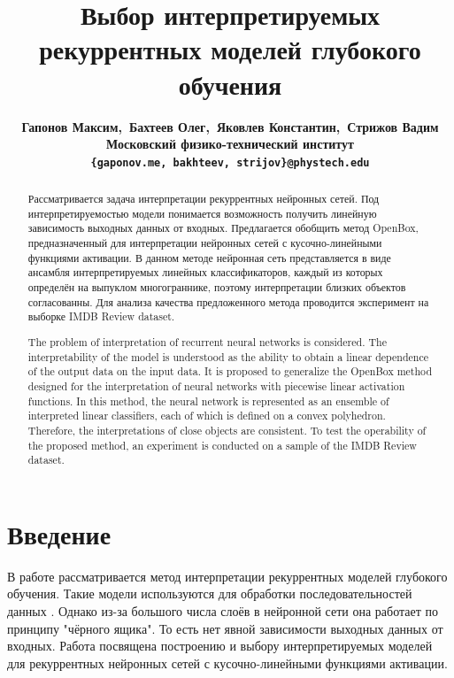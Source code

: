 \documentclass[a4paper, 12pt]{article}
\renewcommand{\abstractname}{Аннотация}
\begin{document}
\title{Выбор интерпретируемых рекуррентных моделей глубокого обучения}
\author{\normalsize\bf{Гапонов Максим,~Бахтеев Олег,~Яковлев Константин,~Стрижов Вадим} \\
	Московский физико-технический институт \\
	\texttt{\{gaponov.me,~bakhteev,~strijov\}@phystech.edu}
}
\date{}
\maketitle
\begin{abstract}
Рассматривается задача интерпретации рекуррентных нейронных сетей. Под интерпретируемостью модели понимается возможность получить линейную зависимость выходных данных от входных. Предлагается обобщить метод OpenBox, предназначенный для интерпретации нейронных сетей с кусочно-линейными функциями активации. В данном методе нейронная сеть представляется в виде ансамбля интерпретируемых линейных классификаторов, каждый из которых определён на выпуклом многограннике, поэтому интерпретации близких объектов согласованны. Для анализа качества предложенного метода проводится эксперимент на выборке IMDB Review dataset.
\end{abstract}
\renewcommand{\abstractname}{Abstract}
\begin{abstract}
The problem of interpretation of recurrent neural networks is considered. The interpretability of the model is understood as the ability to obtain a linear dependence of the output data on the input data. It is proposed to generalize the OpenBox method designed for the interpretation of neural networks with piecewise linear activation functions. In this method, the neural network is represented as an ensemble of interpreted linear classifiers, each of which is defined on a convex polyhedron. Therefore, the interpretations of close objects are consistent. To test the operability of the proposed method, an experiment is conducted on a sample of the IMDB Review dataset.
\end{abstract}


\section{Введение}
В работе рассматривается метод интерпретации рекуррентных моделей глубокого обучения. Такие модели используются для обработки последовательностей данных \cite{lipton2015critical}. Однако из-за большого числа слоёв в нейронной сети она работает по принципу "чёрного ящика". То есть нет явной зависимости выходных данных от входных. Работа посвящена построению и выбору интерпретируемых моделей для рекуррентных нейронных сетей с кусочно-линейными функциями активации.
\end{document}
